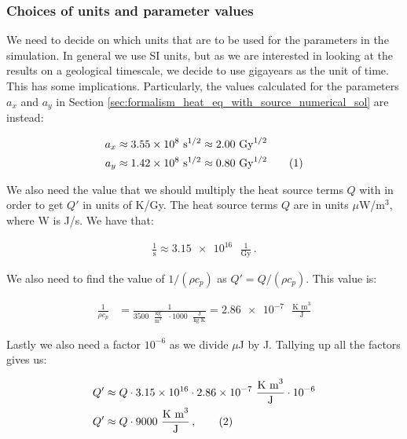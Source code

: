 \documentclass[reprint,english,notitlepage]{revtex4-1}  %
\newcommand\numberthis{\addtocounter{equation}{1}\tag{\theequation}}
\begin{document}
\subsubsection{Choices of units and parameter values} \label{sec:formalism_heat_units_parameters}

We need to decide on which units that are to be used for the parameters in the simulation. In general we use SI units, but as we are interested in looking at the results on a geological timescale, we decide to use gigayears as the unit of time. This has some implications. Particularly, the values calculated for the parameters $a_x$ and $a_y$ in Section \ref{sec:formalism_heat_eq_with_source_numerical_sol} are instead:

\begin{align*}
a_x &\approx \num{3.55e8} \text{ s}^{1/2} \approx 2.00 \text{ Gy}^{1/2} \\
a_y &\approx \num{1.42e8} \text{ s}^{1/2} \approx 0.80 \text{ Gy}^{1/2} \numberthis \label{eq:parameters_xyscale}
\end{align*}

We also need the value that we should multiply the heat source terms $Q$ with in order to get $Q'$ in units of K/Gy. The heat source terms $Q$ are in units $\mu$W/m$^3$, where W is J/s. We have that:

\begin{align*}
\frac{1}{\text{s}} \approx \num{3.15e16} \text{ }\frac{1}{\text{Gy}} \, .
\end{align*} 

We also need to find the value of $1/(\rho c_p)$ as $Q' = Q/(\rho c_p)$. This value is:

\begin{align*}
\frac{1}{\rho c_p} &= \frac{1}{3500 \text{ } \frac{\text{kg}}{\text{m}^3} \text{ } \cdot 1000 \text{ } \frac{\text{J}}{\text{kg K}}} = \num{2.86e-7} \text{ } \frac{\text{K m}^3}{\text{J}}
\end{align*}

Lastly we also need a factor $10^{-6}$ as we divide $\mu$J by J. Tallying up all the factors gives us:

\begin{align*}
Q' &\approx Q \cdot \num{3.15e16} \cdot \num{2.86e-7} \text{ } \frac{\text{K m}^3}{\text{J}} \cdot 10^{-6} \\
Q' &\approx Q \cdot 9000 \text{ } \frac{\text{K m}^3}{\text{J}} \, , \numberthis \label{eq:parameters_heat_transform}
\end{align*}
\end{document}
